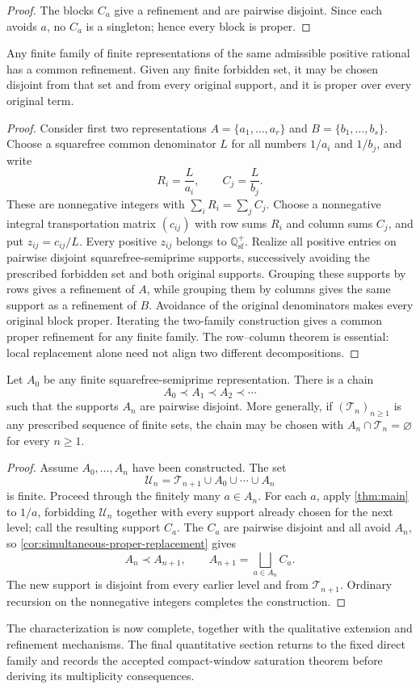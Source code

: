 \begin{proof}
The blocks $C_a$ give a refinement and are pairwise disjoint.  Since each avoids $a$, no $C_a$ is a singleton; hence every block is proper.
\end{proof}

\begin{theorem}
\label{thm:common-refinement}
Any finite family of finite representations of the same admissible positive rational has a common refinement.  Given any finite forbidden set, it may be chosen disjoint from that set and from every original support, and it is proper over every original term.
\end{theorem}

\begin{proof}
Consider first two representations $A=\{a_1,\ldots,a_r\}$ and $B=\{b_1,\ldots,b_s\}$.  Choose a squarefree common denominator $L$ for all numbers $1/a_i$ and $1/b_j$, and write
\[
 R_i=\frac{L}{a_i},
 \qquad
 C_j=\frac{L}{b_j}.
\]
These are nonnegative integers with $\sum_iR_i=\sum_jC_j$.  Choose a nonnegative integral transportation matrix $(c_{ij})$ with row sums $R_i$ and column sums $C_j$, and put $z_{ij}=c_{ij}/L$.  Every positive $z_{ij}$ belongs to $\mathbb Q_{\mathrm{sf}}^+$.  Realize all positive entries on pairwise disjoint squarefree-semiprime supports, successively avoiding the prescribed forbidden set and both original supports.  Grouping these supports by rows gives a refinement of $A$, while grouping them by columns gives the same support as a refinement of $B$.  Avoidance of the original denominators makes every original block proper.  Iterating the two-family construction gives a common proper refinement for any finite family.  The row--column theorem is essential: local replacement alone need not align two different decompositions.
\end{proof}

\begin{theorem}
\label{thm:infinite-refinement-chain}
Let $A_0$ be any finite squarefree-semiprime representation.  There is a chain
\[
 A_0\prec A_1\prec A_2\prec\cdots
\]
such that the supports $A_n$ are pairwise disjoint.  More generally, if $(\mathcal T_n)_{n\geq1}$ is any prescribed sequence of finite sets, the chain may be chosen with $A_n\cap\mathcal T_n=\varnothing$ for every $n\geq1$.
\end{theorem}

\begin{proof}
Assume $A_0,\ldots,A_n$ have been constructed.  The set
\[
 \mathcal U_n=\mathcal T_{n+1}\cup A_0\cup\cdots\cup A_n
\]
is finite.  Proceed through the finitely many $a\in A_n$.  For each $a$, apply \cref{thm:main} to $1/a$, forbidding $\mathcal U_n$ together with every support already chosen for the next level; call the resulting support $C_a$.  The $C_a$ are pairwise disjoint and all avoid $A_n$, so \cref{cor:simultaneous-proper-replacement} gives
\[
 A_n\prec A_{n+1},
 \qquad
 A_{n+1}=\bigsqcup_{a\in A_n}C_a.
\]
The new support is disjoint from every earlier level and from $\mathcal T_{n+1}$.  Ordinary recursion on the nonnegative integers completes the construction.
\end{proof}

The characterization is now complete, together with the qualitative extension and refinement mechanisms.  The final quantitative section returns to the fixed direct family and records the accepted compact-window saturation theorem before deriving its multiplicity consequences.
